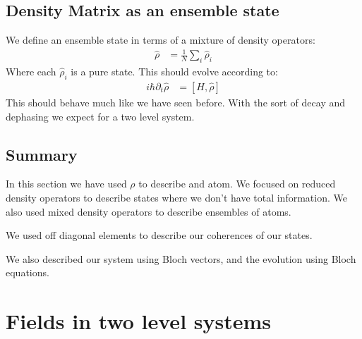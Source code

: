 \subsection{Density Matrix as an ensemble state}
We define an ensemble state in terms of a mixture of density operators:
\begin{align*}
	\hat{\rho} &= \frac{1}{N} \sum_i \hat{\rho}_i
\end{align*}
Where each $\hat{\rho}_i$ is a pure state. This should evolve according to:
\begin{align*}
	i\hbar \partial_t \hat{\rho} &= [H,\hat{\rho}]
\end{align*}
This should behave much like we have seen before. With the sort of decay and dephasing we expect for a two level system.
\subsection{Summary}
In this section we have used $\rho$ to describe and atom. We focused on reduced density operators to describe states where we don't have total information. We also used mixed density operators to describe ensembles of atoms.

We used off diagonal elements to describe our coherences of our states.

We also described our system using Bloch vectors, and the evolution using Bloch equations.
\section{Fields in two level systems}
